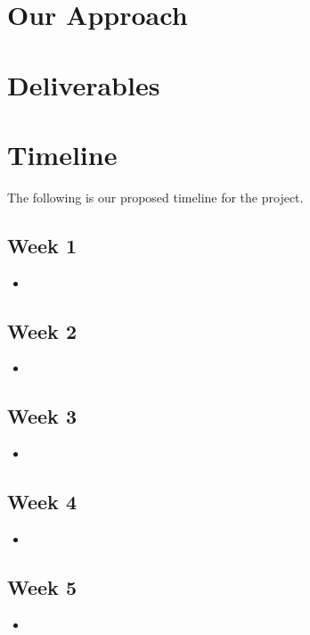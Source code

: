 \documentclass{article}
\theoremstyle{definition}
\begin{document}
\section{Our Approach}




\section{Deliverables}



\newpage
\section{Timeline}
The following is our proposed timeline for the project. 

\subsection*{Week 1}
\begin{itemize}[noitemsep]
    \item 
\end{itemize}

\subsection*{Week 2}
\begin{itemize}[noitemsep]
    \item 
\end{itemize}

\subsection*{Week 3}
\begin{itemize}[noitemsep]
    \item 
\end{itemize}

\subsection*{Week 4}
\begin{itemize}[noitemsep]
    \item 
\end{itemize}

\subsection*{Week 5}
\begin{itemize}[noitemsep]
    \item 
\end{itemize}
\end{document}
